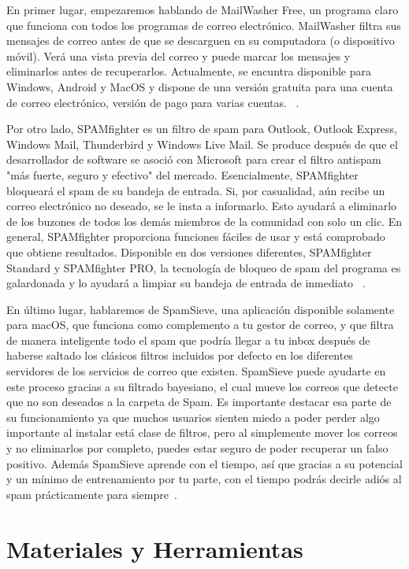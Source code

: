 \documentclass[conference,a4paper]{IEEEtran}
\begin{document}
En primer lugar, empezaremos hablando de MailWasher Free, un programa claro que funciona con todos los programas de correo electrónico. MailWasher filtra sus mensajes de correo antes de que se descarguen en su computadora (o dispositivo móvil). Verá una vista previa del correo y puede marcar los mensajes y eliminarlos antes de recuperarlos. Actualmente, se encuntra disponible para Windows, Android y MacOS y dispone de una versión gratuita para una cuenta de correo electrónico, versión de pago para varias cuentas.  ~\cite{b5}. 


Por otro lado, SPAMfighter es un filtro de spam para Outlook, Outlook Express, Windows Mail, Thunderbird y Windows Live Mail. Se produce después de que el desarrollador de software se asoció con Microsoft para crear el filtro antispam "más fuerte, seguro y efectivo" del mercado. Esencialmente, SPAMfighter bloqueará el spam de su bandeja de entrada. Si, por casualidad, aún recibe un correo electrónico no deseado, se le insta a informarlo. Esto ayudará a eliminarlo de los buzones de todos los demás miembros de la comunidad con solo un clic. En general, SPAMfighter proporciona funciones fáciles de usar y está comprobado que obtiene resultados. Disponible en dos versiones diferentes, SPAMfighter Standard y SPAMfighter PRO, la tecnología de bloqueo de spam del programa es galardonada y lo ayudará a limpiar su bandeja de entrada de inmediato ~\cite{b6}.



En último lugar, hablaremos de SpamSieve, una aplicación disponible solamente para macOS, que funciona como complemento a tu gestor de correo, y que filtra de manera inteligente todo el spam que podría llegar a tu inbox después de haberse saltado los clásicos filtros incluidos por defecto en los diferentes servidores de los servicios de correo que existen. SpamSieve puede ayudarte en este proceso gracias a su filtrado bayesiano, el cual mueve los correos que detecte que no son deseados a la carpeta de Spam. Es importante destacar esa parte de su funcionamiento ya que muchos usuarios sienten miedo a poder perder algo importante al instalar está clase de filtros, pero al simplemente mover los correos y no eliminarlos por completo, puedes estar seguro de poder recuperar un falso positivo. Además SpamSieve aprende con el tiempo, así que gracias a su potencial y un mínimo de entrenamiento por tu parte, con el tiempo podrás decirle adiós al spam prácticamente para siempre~\cite{b7}.



\section{Materiales y Herramientas}
\end{document}
